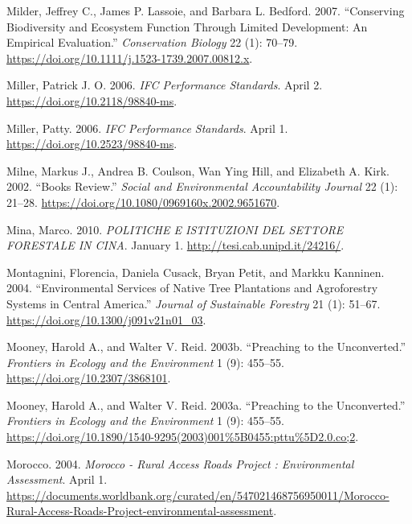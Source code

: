 \begin{CSLReferences}{1}{1}
Milder, Jeffrey C., James P. Lassoie, and Barbara L. Bedford. 2007.
{``Conserving Biodiversity and Ecosystem Function Through Limited
Development: An Empirical Evaluation.''} \emph{Conservation Biology} 22
(1): 70--79. \url{https://doi.org/10.1111/j.1523-1739.2007.00812.x}.

Miller, Patrick J. O. 2006. \emph{IFC Performance Standards}. April 2.
\url{https://doi.org/10.2118/98840-ms}.

Miller, Patty. 2006. \emph{IFC Performance Standards}. April 1.
\url{https://doi.org/10.2523/98840-ms}.

Milne, Markus J., Andrea B. Coulson, Wan Ying Hill, and Elizabeth A.
Kirk. 2002. {``Books Review.''} \emph{Social and Environmental
Accountability Journal} 22 (1): 21--28.
\url{https://doi.org/10.1080/0969160x.2002.9651670}.

Mina, Marco. 2010. \emph{POLITICHE E ISTITUZIONI DEL SETTORE FORESTALE
IN CINA}. January 1. \url{http://tesi.cab.unipd.it/24216/}.

Montagnini, Florencia, Daniela Cusack, Bryan Petit, and Markku Kanninen.
2004. {``Environmental Services of Native Tree Plantations and
Agroforestry Systems in Central America.''} \emph{Journal of Sustainable
Forestry} 21 (1): 51--67. \url{https://doi.org/10.1300/j091v21n01_03}.

Mooney, Harold A., and Walter V. Reid. 2003b. {``Preaching to the
Unconverted.''} \emph{Frontiers in Ecology and the Environment} 1 (9):
455--55. \url{https://doi.org/10.2307/3868101}.

Mooney, Harold A., and Walter V. Reid. 2003a. {``Preaching to the
Unconverted.''} \emph{Frontiers in Ecology and the Environment} 1 (9):
455--55.
\url{https://doi.org/10.1890/1540-9295(2003)001\%5B0455:pttu\%5D2.0.co;2}.

Morocco. 2004. \emph{Morocco - Rural Access Roads Project :
Environmental Assessment}. April 1.
\url{https://documents.worldbank.org/curated/en/547021468756950011/Morocco-Rural-Access-Roads-Project-environmental-assessment}.


\end{CSLReferences}
